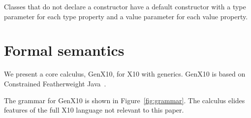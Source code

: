 \documentclass[preprint,nocopyrightspace,9pt]{sigplanconf}
\begin{document}
Classes that do not declare a constructor
have a default constructor with a type parameter for each
type property and a value parameter for each value property.

\section{Formal semantics}

\newcommand\gxx{GenX10\xspace}
\newcommand\xbar[1]{\ensuremath{\bar{\Xcd{#1}}}}
\newcommand\tbar[1]{\ensuremath{\bar{\tt {#1}}}}
\newcommand\exc[2]{\ensuremath{\exists}#1.~#2}
\newcommand\exty[3]{\ensuremath{\exists}#1\ty#2.~#3}
\newcommand\extyty[5]{\ensuremath{\exists}#1\ty#2,#3\ty#4.~#5}
\newcommand\extytyty[7]{\ensuremath{\exists}#1\ty#2,#3\ty#4,#5\ty#6.~#7}

We present a core calculus, \gxx, for X10 with generics.
\gxx is based on Constrained Featherweight
Java~\cite{constrained-types}.


The grammar for \gxx is shown in 
Figure~\ref{fig:grammar}.  The calculus elides features of the
full X10 language not relevant to this paper.
\end{document}
